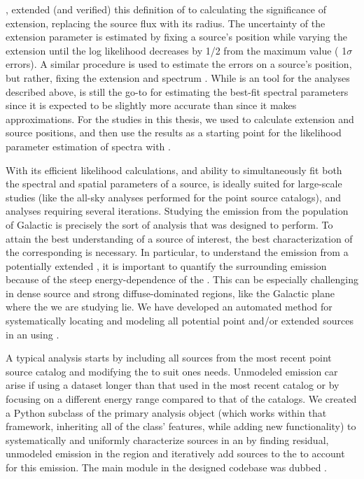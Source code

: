 {\cite{Lande12}, extended (and verified) this definition of \ts{} to calculating the significance of extension, replacing the source flux with its radius. The uncertainty of the extension parameter is estimated by fixing a source's position while varying the extension until the log likelihood decreases by 1/2 from the maximum value (\ie{}  1$\sigma$ errors).   A similar procedure is used to estimate the errors on a source's position, but rather,  fixing the extension and spectrum \citep{2FGL}. While \ptlike{} is an tool for the analyses described above, \gtlike{} is still the go-to for estimating the best-fit spectral parameters since it is expected to be slightly more accurate than \ptlike{} since it makes approximations. For the studies in this thesis, we used \ptlike{} to calculate extension and source positions, and then use the \ptlike{} results as a starting point for the likelihood parameter estimation of spectra with \gtlike{}.

With its efficient likelihood calculations, and ability to simultaneously fit both the spectral and spatial parameters of a source, \ptlike{} is ideally suited for large-scale studies (like the all-sky analyses performed for the \lat{} point source catalogs), and analyses requiring several iterations. Studying the \gam{} emission from the population of Galactic \snrs{} is precisely the sort of analysis that \ptlike{} was designed to perform. To attain the best understanding of a source of interest, the best characterization of the corresponding \roi{} is necessary. In particular, to understand the \gev{} emission from a potentially extended \snr{}, it is important to quantify the surrounding emission because of the steep energy-dependence of the \lat{} \psf{}. This can be especially challenging in dense source and strong diffuse-dominated regions, like the Galactic plane where the \snrs{} we are studying lie. We have developed an automated method for systematically locating and modeling all potential point and/or extended sources in an \roi{} using \ptlike{}. 

A typical \lat{} analysis starts by including all sources from the most recent \lat{} point source catalog and modifying the \roi{} to suit ones needs. Unmodeled emission car arise if using a dataset longer than that used in the most recent catalog or by focusing on a different energy range compared to that of the catalogs. We created a Python subclass of the primary \ptlike{} analysis object (which works within that framework, inheriting all of the class' features, while adding new functionality) to systematically and uniformly characterize sources in an \roi{} by finding residual, unmodeled emission in the region and iteratively add sources to the \roi{} to account for this emission. The main module in the designed codebase was dubbed \srcs{}. 

}
